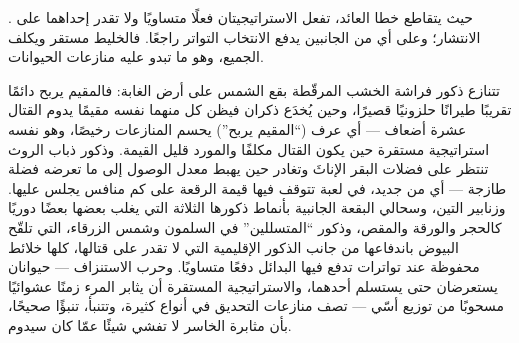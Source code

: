 \begin{omfigure}

{\small {}. حيث يتقاطع خطا العائد، تفعل
الاستراتيجيتان فعلًا متساويًا ولا تقدر إحداهما على الانتشار؛
وعلى أي من الجانبين يدفع الانتخاب التواتر راجعًا. فالخليط
مستقر ويكلف الجميع، وهو ما تبدو عليه منازعات الحيوانات.}
\end{omfigure}

\begin{example}\label{ex:b3:behavioural-ecology:games}
تتنازع ذكور فراشة الخشب المرقّطة بقع الشمس على أرض الغابة:
فالمقيم يربح دائمًا تقريبًا طيرانًا حلزونيًا قصيرًا، وحين
يُخدَع ذكران فيظن كل منهما نفسه مقيمًا يدوم القتال عشرة
أضعاف --- أي عرف (``المقيم يربح'') يحسم المنازعات
رخيصًا، وهو نفسه استراتيجية مستقرة حين يكون القتال مكلفًا
والمورد قليل القيمة. وذكور ذباب الروث تنتظر على فضلات البقر
الإناثَ وتغادر حين يهبط معدل الوصول إلى ما تعرضه فضلة طازجة
--- أي  من جديد، في لعبة تتوقف فيها قيمة
الرقعة على كم منافس يجلس عليها. وزنابير التين، وسحالي
البقعة الجانبية بأنماط ذكورها الثلاثة التي يغلب بعضها بعضًا
دوريًا كالحجر والورقة والمقص، وذكور ``المتسللين'' في السلمون
وشمس الزرقاء، التي تلقّح البيوض باندفاعها من جانب الذكور
الإقليمية التي لا تقدر على قتالها، كلها خلائط محفوظة عند
تواترات تدفع فيها البدائل دفعًا متساويًا. وحرب الاستنزاف ---
حيوانان يستعرضان حتى يستسلم أحدهما، والاستراتيجية المستقرة
أن يثابر المرء زمنًا عشوائيًا مسحوبًا من توزيع أسّي ---
تصف منازعات التحديق في أنواع كثيرة، وتتنبأ، تنبؤًا صحيحًا،
بأن مثابرة الخاسر لا تفشي شيئًا عمّا كان سيدوم.
\end{example}

